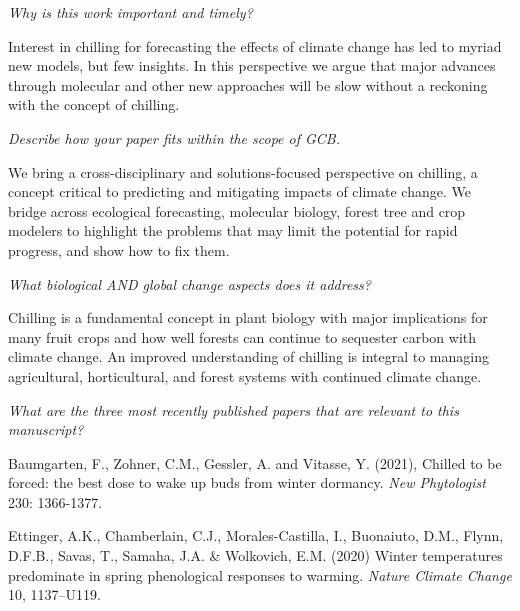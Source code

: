 \documentclass[11pt,a4paper]{article}
\begin{document}
\emph{Why is this work important and timely?} %

Interest in chilling for forecasting the effects of climate change has led to myriad new models, but few insights. In this perspective we argue that major advances through molecular and other new approaches will be slow without a reckoning with the concept of chilling. 

\emph{Describe how your paper fits within the scope of GCB.} %

We bring a cross-disciplinary and solutions-focused perspective on chilling, a concept critical to predicting and mitigating impacts of climate change. We bridge across ecological forecasting, molecular biology, forest tree and crop modelers to highlight the problems that may limit the potential for rapid progress, and show how to fix them. 

\emph{What biological AND global change aspects does it address?} %

Chilling is a fundamental concept in plant biology with major implications for many fruit crops and how well forests can continue to sequester carbon with climate change. An improved understanding of chilling is integral to managing agricultural, horticultural, and forest systems with continued climate change. %

\emph{What are the three most recently published papers that are relevant to this manuscript?} 

Baumgarten, F., Zohner, C.M., Gessler, A. and Vitasse, Y. (2021), Chilled to be forced: the best dose to wake up buds from winter dormancy. \emph{New Phytologist} 230: 1366-1377. 

Ettinger, A.K., Chamberlain, C.J., Morales-Castilla, I., Buonaiuto, D.M., Flynn, D.F.B., Savas, T., Samaha, J.A. \& Wolkovich, E.M. (2020) Winter temperatures predominate in spring phenological responses to warming. \emph{Nature Climate Change} 10, 1137–U119.\\

\end{document}
